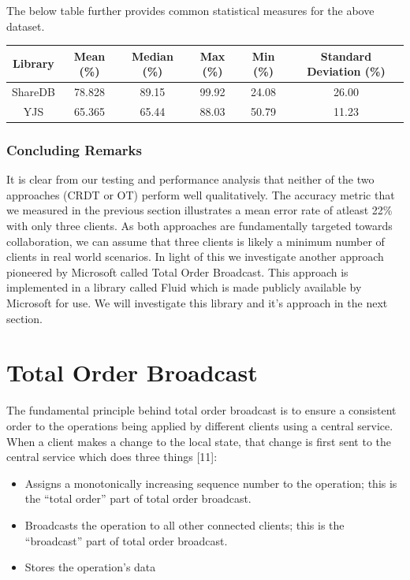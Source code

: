 \documentclass[9pt, titlepage]{article}
\begin{document}
  The below table further provides common statistical measures for the above dataset.\\

  \begin{center}
    \begin{tabular}{||c c c c c c||} 
      \hline
      Library & Mean (\%) & Median (\%) & Max (\%) & Min (\%) & Standard Deviation (\%) \\ [0.5ex] 
      \hline\hline
      ShareDB & 78.828 & 89.15 & 99.92 & 24.08 & 26.00 \\ 
      \hline
      YJS & 65.365 & 65.44 & 88.03 & 50.79 & 11.23 \\
      \hline
    \end{tabular}
  \end{center}
  \hfill

  \subsubsection{Concluding Remarks}
  It is clear from our testing and performance analysis that neither of the two approaches (CRDT or OT) perform well qualitatively.
  The accuracy metric that we measured in the previous section illustrates a mean error rate of atleast 22\% with only three clients.
  As both approaches are fundamentally targeted towards collaboration, we can assume that three clients is likely a minimum number of
  clients in real world scenarios. In light of this we investigate another approach pioneered by Microsoft called Total Order Broadcast.
  This approach is implemented in a library called Fluid which is made publicly available by Microsoft for use. We will investigate this
  library and it's approach in the next section.

  \break
  \section{Total Order Broadcast}
  The fundamental principle behind total order broadcast is to ensure a consistent order to the operations being applied by different 
  clients using a central service. When a client makes a change to the local state, that change is first sent to the central service 
  which does three things [11]:

  \begin{itemize}
    \item Assigns a monotonically increasing sequence number to the operation; this is the “total order” part of total order broadcast.
    \item Broadcasts the operation to all other connected clients; this is the “broadcast” part of total order broadcast.
    \item Stores the operation's data
  \end{itemize}
\end{document}
